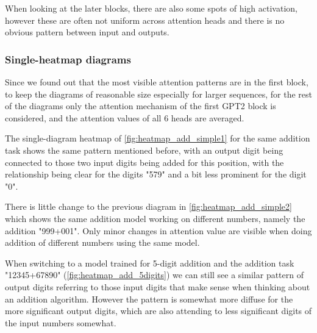 When looking at the later blocks, there are also some spots of high activation, however these are often not uniform across attention heads and there is no obvious pattern between input and outputs.

\subsubsection{Single-heatmap diagrams}

Since we found out that the most visible attention patterns are in the first block, to keep the diagrams of reasonable size especially for larger sequences, for the rest of the diagrams only the attention mechanism of the first GPT2 block is considered, and the attention values of all 6 heads are averaged.


The single-diagram heatmap of \cref{fig:heatmap_add_simple1} for the same addition task shows the same pattern mentioned before, with an output digit being connected to those two input digits being added for this position, with the relationship being clear for the digits "579" and a bit less prominent for the digit "0".


There is little change to the previous diagram in \cref{fig:heatmap_add_simple2} which shows the same addition model working on different numbers, namely the addition "999+001". Only minor changes in attention value are visible when doing addition of different numbers using the same model.


When switching to a model trained for 5-digit addition and the addition task "12345+67890" (\cref{fig:heatmap_add_5digits}) we can still see a similar pattern of output digits referring to those input digits that make sense when thinking about an addition algorithm. However the pattern is somewhat more diffuse for the more significant output digits, which are also attending to less significant digits of the input numbers somewhat.

